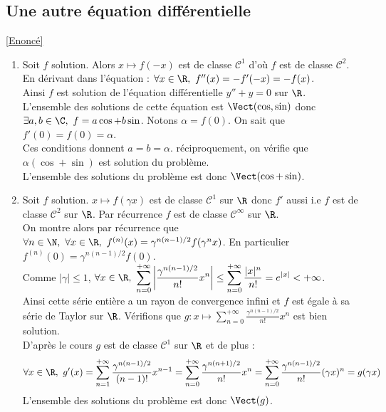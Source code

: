 \documentclass{book}
\begin{document}
	\subsection{Une autre équation différentielle }
	\label{Une autre équation différentielle corrigé}
	\textcolor{blue}{\hyperref[Une autre équation différentielle]{[Enoncé]}}\\
	\begin{enumerate}[leftmargin=*]
		\item Soit $f$ solution. Alors $x\mapsto f(-x)$ est de classe $\mathcal C^1$ d'où $f$ est de classe $\mathcal C^2$.\\
		En dérivant dans l'équation : $\forall x\in \R,\ f''(x)=-f'(-x)=-f(x)$.\\
		Ainsi $f$ est solution de l'équation différentielle $y''+y=0$ sur $\R$.\\
		L'ensemble des solutions de cette équation est $\Vect(\cos,\sin)$ donc $\exists a,b\in \C,\ f=a\cos+b\sin$. Notons $\alpha=f(0)$. On sait que $f'(0)=f(0)=\alpha$.\\
		Ces conditions donnent $a=b=\alpha$. réciproquement, on vérifie que $\alpha(\cos+\sin)$ est solution du problème.\\
		L'ensemble des solutions du problème est donc $\Vect(\cos+\sin)$.
		\item Soit $f$ solution. $x\mapsto f(\gamma x)$ est de classe $\mathcal C^1$ sur $\R$ donc $f'$ aussi i.e $f$ est de classe $\mathcal C^2$ sur $\R$. Par récurrence $f$ est de classe $\mathcal C^\infty$ sur $\R$.\\
		On montre alors par récurrence que $\forall n\in \N,\ \forall x\in \R,\ f^{(n)}(x)=\gamma^{n(n-1)/2}f(\gamma^nx)$. En particulier $f^{(n)}(0)=\gamma^{n(n-1)/2}f(0)$.\\
		Comme $|\gamma|\leq 1$, $\forall x\in \R,\ \displaystyle\sum_{n=0}^{+\infty}\left|\frac{\gamma^{n(n-1)/2}}{n!}x^n\right|\leq \sum_{n=0}^{+\infty}\frac{|x|^n}{n!}=e^{|x|}<+\infty$.\\
		Ainsi cette série entière a un rayon de convergence infini et $f$ est égale à sa série de Taylor sur $\R$.
		Vérifions que $g:x\mapsto \displaystyle\sum_{n=0}^{+\infty}\frac{\gamma^{n(n-1)/2}}{n!}x^n$ est bien solution.\\
		D'après le cours $g$ est de classe $\mathcal C^1$ sur $\R$ et de plus :
		$$\forall x\in \R,\ g'(x)=\sum_{n=1}^{+\infty}\frac{\gamma^{n(n-1)/2}}{(n-1)!}x^{n-1}=\sum_{n=0}^{+\infty}\frac{\gamma^{n(n+1)/2}}{n!}x^n=\sum_{n=0}^{+\infty}\frac{\gamma^{n(n-1)/2}}{n!}(\gamma x)^n=g(\gamma x)$$
		L'ensemble des solutions du problème est donc $\Vect(g)$.
	\end{enumerate}
	
\end{document}
